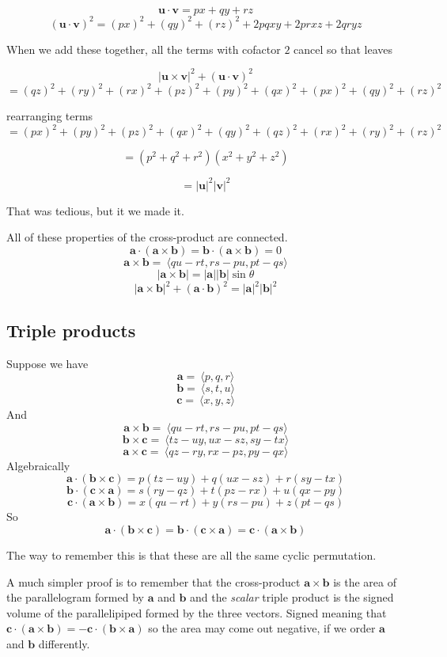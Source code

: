 \documentclass[11pt, oneside]{article}   	%
\begin{document}
\[ \mathbf{u} \cdot \mathbf{v} = px + qy + rz \]
\[ (\mathbf{u} \cdot \mathbf{v})^2 = (px)^2 + (qy)^2 + (rz)^2 + 2pqxy + 2prxz + 2qryz \]

When we add these together, all the terms with cofactor $2$ cancel so that leaves

\[ | \mathbf{u} \times \mathbf{v} |^2 + (\mathbf{u} \cdot \mathbf{v})^2 \]
\[ =  (qz)^2 + (ry)^2 + (rx)^2 + (pz)^2 + (py)^2 + (qx)^2 + (px)^2 + (qy)^2 + (rz)^2 \]


rearranging terms
\[ = (px)^2 + (py)^2 + (pz)^2 + (qx)^2 + (qy)^2 + (qz)^2 + (rx)^2 +(ry)^2   + (rz)^2 \]

\[ = (p^2 + q^2 + r^2)(x^2 + y^2 + z^2) \]

\[ = |\mathbf{u}|^2 |\mathbf{v}|^2 \]

That was tedious, but it we made it.

All of these properties of the cross-product are connected.
\[ \mathbf{a}  \cdot (\mathbf{a} \times \mathbf{b}) = \mathbf{b}  \cdot (\mathbf{a} \times \mathbf{b}) = 0 \]
\[ \mathbf{a} \times \mathbf{b} =  \ \langle qu-rt, rs-pu, pt-qs \rangle \]
\[ |\mathbf{a} \times \mathbf{b}|  = |\mathbf{a}| |\mathbf{b}| \sin \theta \]
\[ | \mathbf{a} \times \mathbf{b} |^2 + (\mathbf{a} \cdot \mathbf{b})^2 = |\mathbf{a}|^2 |\mathbf{b}|^2 \]

\subsection*{Triple products}
Suppose we have
\[\mathbf{a} = \ \langle p,q,r \rangle \]
\[\mathbf{b} = \ \langle s,t,u \rangle \]
\[\mathbf{c} = \ \langle x,y,z \rangle \]
And
\[ \mathbf{a} \times \mathbf{b} =  \ \langle qu-rt, rs-pu, pt-qs \rangle \]
\[ \mathbf{b} \times \mathbf{c} =  \ \langle tz-uy, ux-sz, sy-tx \rangle \]
\[ \mathbf{a} \times \mathbf{c} =  \ \langle qz-ry, rx-pz, py-qx \rangle \]
Algebraically
\[ \mathbf{a} \cdot (\mathbf{b} \times \mathbf{c}) = p(tz-uy) + q(ux-sz) + r(sy-tx)  \]
\[ \mathbf{b} \cdot (\mathbf{c} \times \mathbf{a}) = s(ry-qz) + t(pz-rx) + u(qx-py) \]
\[ \mathbf{c} \cdot (\mathbf{a} \times \mathbf{b}) = x(qu-rt) + y(rs-pu) + z(pt-qs) \]
So
\[ \mathbf{a} \cdot (\mathbf{b} \times \mathbf{c}) = \mathbf{b} \cdot (\mathbf{c} \times \mathbf{a}) = \mathbf{c} \cdot (\mathbf{a} \times \mathbf{b}) \]

The way to remember this is that these are all the same cyclic permutation.

A much simpler proof is to remember that the cross-product $\mathbf{a} \times \mathbf{b}$ is the area of the parallelogram formed by $\mathbf{a}$ and $\mathbf{b}$ and the \emph{scalar} triple product is the signed volume of the parallelipiped formed by the three vectors.   Signed meaning that $\mathbf{c} \cdot (\mathbf{a} \times \mathbf{b}) = -\mathbf{c} \cdot (\mathbf{b} \times \mathbf{a})$ so the area may come out negative, if we order $\mathbf{a}$ and $\mathbf{b}$ differently.
\end{document}
